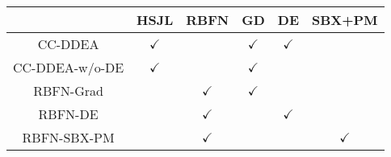 \begin{tabular}{|c|cc|ccc|}
\hline
               & HSJL    & RBFN & GD           & DE           & SBX+PM       \\ \hline
CC-DDEA        & $\checkmark$ & & $\checkmark$ & $\checkmark$ &      \\ \hline
CC-DDEA-w/o-DE & $\checkmark$ & & $\checkmark$ &      &      \\ \hline
RBFN-Grad      &      &$\checkmark$ & $\checkmark$ &      &      \\ \hline
RBFN-DE        &      &$\checkmark$ &      & $\checkmark$ &     \\ \hline
RBFN-SBX-PM    &      &$\checkmark$ &      &      & $\checkmark$ \\ \hline
\end{tabular}
